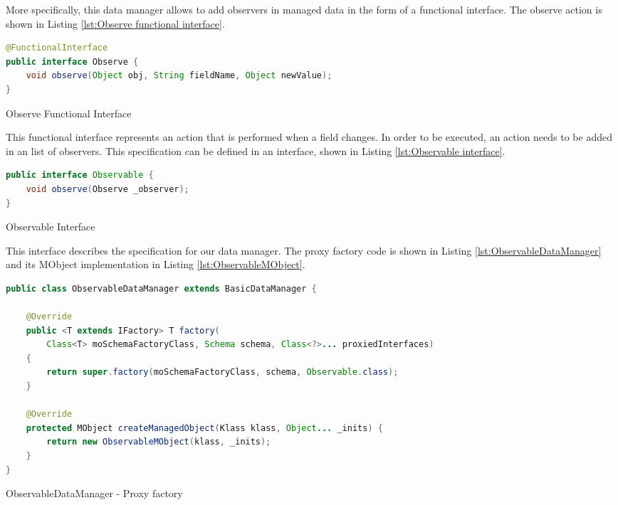 More specifically, this data manager allows to add observers in managed data in the form of a functional interface.
The observe action is shown in Listing \ref{lst:Observe functional interface}.

\begin{sourcecode} [H]
	\begin{lstlisting}[language=Java, escapechar=|]
@FunctionalInterface
public interface Observe {
	void observe(Object obj, String fieldName, Object newValue);
}
	\end{lstlisting}
	\caption{Observe Functional Interface}
	\label{lst:Observe functional interface}
\end{sourcecode}

This functional interface represents an action that is performed when a field changes.
In order to be executed, an action needs to be added in an list of observers.
This specification can be defined in an interface, shown in Listing \ref{lst:Observable interface}.

\begin{sourcecode} [H]
	\begin{lstlisting}[language=Java, escapechar=|]
public interface Observable {
	void observe(Observe _observer);
}
	\end{lstlisting}
	\caption{Observable Interface}
	\label{lst:Observable interface}
\end{sourcecode}

This interface describes the specification for our data manager.
The proxy factory code is shown in Listing \ref{lst:ObservableDataManager} and its MObject implementation in Listing \ref{lst:ObservableMObject}.

\begin{sourcecode} [H]
	\begin{lstlisting}[language=Java, escapechar=|]
public class ObservableDataManager extends BasicDataManager {

    @Override
    public <T extends IFactory> T factory(
    	Class<T> moSchemaFactoryClass, Schema schema, Class<?>... proxiedInterfaces) 
    {
        return super.factory(moSchemaFactoryClass, schema, Observable.class);
    }

    @Override
    protected MObject createManagedObject(Klass klass, Object... _inits) {
        return new ObservableMObject(klass, _inits);
    }
}
	\end{lstlisting}
	\caption{ObservableDataManager - Proxy factory}
	\label{lst:ObservableDataManager}
\end{sourcecode}

